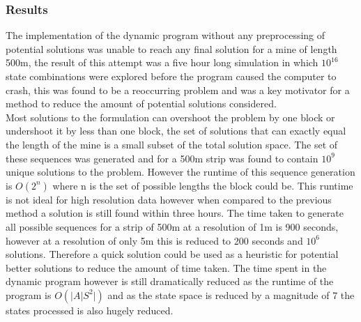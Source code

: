 \subsubsection{Results}
The implementation of the dynamic program without any preprocessing of potential solutions was unable to reach any final solution for a mine of length 500m, the result of this attempt was a five hour long simulation in which $10^16$ state combinations were explored before the program caused the computer to crash, this was found to be a reoccurring problem and was a key motivator for a method to reduce the amount of potential solutions considered. \\
Most solutions to the formulation can overshoot the problem by one block or undershoot it by less than one block, the set of solutions that can exactly equal the length of the mine is a small subset of the total solution space. The set of these sequences was generated and for a 500m strip was found to contain $10^9$ unique solutions to the problem. However the runtime of this sequence generation is $O(2^n)$ where n is the set of possible lengths the block could be. This runtime is not ideal for high resolution data however when compared to the previous method a solution is still found within three hours. The time taken to generate all possible sequences for a strip of 500m at a resolution of 1m is 900 seconds, however at a resolution of only 5m this is reduced to 200 seconds and $10^6$ solutions. Therefore a quick solution could be used as a heuristic for potential better solutions to reduce the amount of time taken. The time spent in the dynamic program however is still dramatically reduced as the runtime of the program is $O(|A|S^2|)$ and as the state space is reduced by a magnitude of 7 the states processed is also hugely reduced. 




